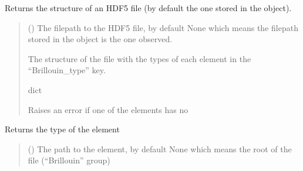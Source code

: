 \documentclass[letterpaper,10pt,english]{sphinxmanual}
\begin{document}
\begin{fulllineitems}

\begin{fulllineitems}
\label{\detokenize{_autosummary/HDF5_BLS.wrapper:HDF5_BLS.wrapper.Wrapper.get_structure}}
\pysigstartsignatures
\pysiglinewithargsret
{}
{}
{}
\pysigstopsignatures
\sphinxAtStartPar
Returns the structure of an HDF5 file (by default the one stored in the object).
\begin{quote}\begin{description}
\sphinxAtStartPar
{} (\sphinxstyleliteralemphasis{\sphinxupquote{, }}) \textendash{} The filepath to the HDF5 file, by default None which means the filepath stored in the object is the one observed.

\sphinxAtStartPar
The structure of the file with the types of each element in the “Brillouin\_type” key.

\sphinxAtStartPar
dict

\sphinxAtStartPar
{} \textendash{} Raises an error if one of the elements has no

\end{description}\end{quote}

\end{fulllineitems}


\begin{fulllineitems}
\label{\detokenize{_autosummary/HDF5_BLS.wrapper:HDF5_BLS.wrapper.Wrapper.get_type}}
\pysigstartsignatures
\pysiglinewithargsret
{}
{\sphinxparamcomma {}}
{}
\pysigstopsignatures
\sphinxAtStartPar
Returns the type of the element
\begin{quote}\begin{description}
\sphinxAtStartPar
{} (\sphinxstyleliteralemphasis{\sphinxupquote{, }}) \textendash{} The path to the element, by default None which means the root of the file (“Brillouin” group)


\end{description}
\end{quote}
\end{fulllineitems}
\end{fulllineitems}
\end{document}
